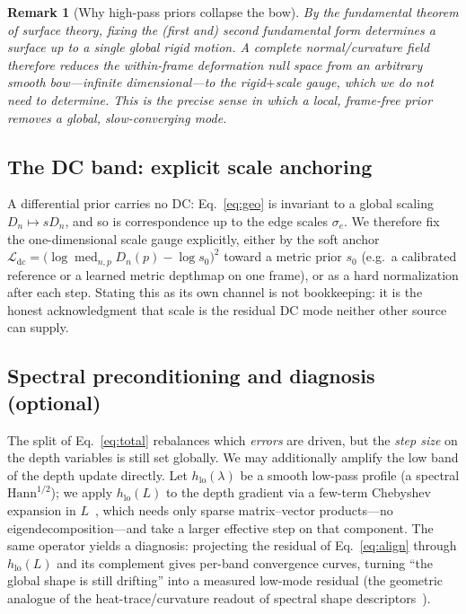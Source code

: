 \documentclass{article}
\newtheorem{remark}[theorem]{Remark}
\begin{document}
\begin{remark}[Why high-pass priors collapse the bow]
By the fundamental theorem of surface theory, fixing the (first and) second
fundamental form determines a surface up to a single global rigid motion. A
complete normal/curvature field therefore reduces the within-frame
deformation null space from an arbitrary smooth bow---infinite
dimensional---to the rigid$+$scale gauge, which we do not need to determine.
This is the precise sense in which a local, frame-free prior removes a global,
slow-converging mode.
\end{remark}

\subsection{The DC band: explicit scale anchoring}

A differential prior carries no DC: Eq.~\eqref{eq:geo} is invariant to a global
scaling $D_n\!\mapsto\! s D_n$, and so is correspondence up to the edge scales
$\sigma_e$. We therefore fix the one-dimensional scale gauge explicitly, either
by the soft anchor
$\mathcal L_{\mathrm{dc}}=\big(\log\operatorname{med}_{n,p}D_n(p)-\log s_0\big)^2$
toward a metric prior $s_0$ (e.g.\ a calibrated reference or a learned metric
depthmap on one frame), or as a hard normalization after each step. Stating
this as its own channel is not bookkeeping: it is the honest acknowledgment
that scale is the residual DC mode neither other source can supply.

\subsection{Spectral preconditioning and diagnosis (optional)}

The split of Eq.~\eqref{eq:total} rebalances which \emph{errors} are driven,
but the \emph{step size} on the depth variables is still set globally. We may
additionally amplify the low band of the depth update directly. Let $h_{\mathrm{lo}}(\lambda)$ be a smooth low-pass profile (a
spectral $\mathrm{Hann}^{1/2}$); we apply $h_{\mathrm{lo}}(L)$ to the depth
gradient via a few-term Chebyshev expansion in $L$~\cite{hammond2011wavelets,defferrard2016convolutional},
which needs only sparse matrix--vector products---no eigendecomposition---and
take a larger effective step on that component. The same operator yields a
diagnosis: projecting the residual of Eq.~\eqref{eq:align} through
$h_{\mathrm{lo}}(L)$ and its complement gives per-band convergence curves,
turning ``the global shape is still drifting'' into a measured low-mode
residual (the geometric analogue of the heat-trace/curvature readout of
spectral shape descriptors~\cite{reuter2006laplace}).
\end{document}
